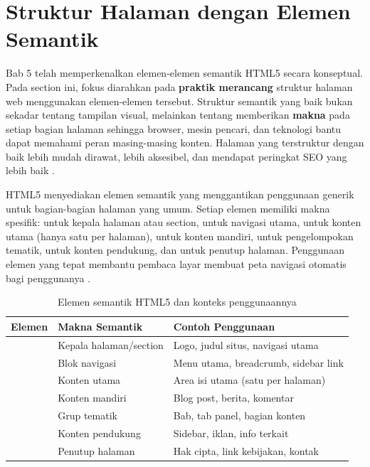 ﻿\section[Struktur Halaman dengan Elemen Semantik]{Struktur Halaman dengan Elemen Semantik}

Bab 5 telah memperkenalkan elemen-elemen semantik HTML5 secara konseptual. Pada section ini, fokus diarahkan pada \textbf{praktik merancang} struktur halaman web menggunakan elemen-elemen tersebut. Struktur semantik yang baik bukan sekadar tentang tampilan visual, melainkan tentang memberikan \textbf{makna} pada setiap bagian halaman sehingga browser, mesin pencari, dan teknologi bantu dapat memahami peran masing-masing konten. Halaman yang terstruktur dengan baik lebih mudah dirawat, lebih aksesibel, dan mendapat peringkat SEO yang lebih baik \cite{webdevHtml}.

HTML5 menyediakan elemen semantik yang menggantikan penggunaan  generik untuk bagian-bagian halaman yang umum. Setiap elemen memiliki makna spesifik:  untuk kepala halaman atau section,  untuk navigasi utama,  untuk konten utama (hanya satu per halaman),  untuk konten mandiri,  untuk pengelompokan tematik,  untuk konten pendukung, dan  untuk penutup halaman. Penggunaan elemen yang tepat membantu pembaca layar membuat peta navigasi otomatis bagi penggunanya \cite{mdnHtmlIntro}.

\begin{table}[H]
\centering
\begin{tabular}{|P{2.2cm}|P{4cm}|P{5.5cm}|}
\hline
\textbf{Elemen} & \textbf{Makna Semantik} & \textbf{Contoh Penggunaan} \\
\hline
{} & Kepala halaman/section & Logo, judul situs, navigasi utama \\
\hline
{} & Blok navigasi & Menu utama, breadcrumb, sidebar link \\
\hline
{} & Konten utama & Area isi utama (satu per halaman) \\
\hline
{} & Konten mandiri & Blog post, berita, komentar \\
\hline
{} & Grup tematik & Bab, tab panel, bagian konten \\
\hline
{} & Konten pendukung & Sidebar, iklan, info terkait \\
\hline
{} & Penutup halaman & Hak cipta, link kebijakan, kontak \\
\hline
\end{tabular}
\caption{Elemen semantik HTML5 dan konteks penggunaannya}
\end{table}

